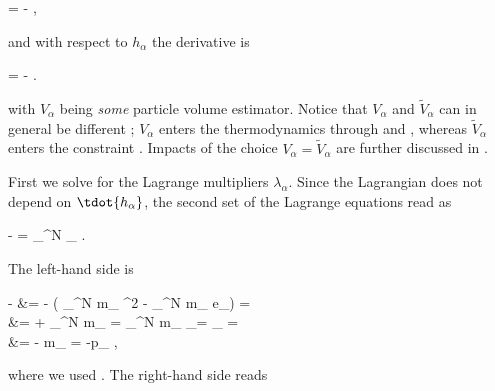 \documentclass[../main.tex]{subfiles}
\begin{document}
\begin{equations}[single,!,numberline=all]
\label{eq:E-X-DERIVATIVE}
 = -  ,
\end{equations}

and with respect to $h_{\alpha}$ the derivative is

\begin{equations}[single,!,numberline=all]
\label{eq:E-H-DERIVATIVE}
 = -  .
\end{equations}

with $V_{\alpha}$ being \emph{some} particle volume estimator. Notice that $V_{\alpha}$ and $\tilde{V}_{\alpha}$ can in general be different \autocite{hopkinsGeneralClassLagrangian2013a}; $V_{\alpha}$ enters the thermodynamics through  and , whereas $\tilde{V}_{\alpha}$ enters the constraint . Impacts of the choice $V_{\alpha} = \tilde{V}_{\alpha}$ are further discussed in \eg \autocite[p.~3]{hopkinsGeneralClassLagrangian2013a}.

First we solve for the Lagrange multipliers $\lambda_{\alpha}$. Since the Lagrangian  does not depend on $\tdot{h_{\alpha}}$, the second set of the Lagrange equations  read as

\begin{equations}[single,*]
	-  = \sum_{}^N \lambda_{\beta} .
\end{equations}

The left-hand side is

\begin{equations}[columns,*]
	-  &= - \left( \sum_{}^N m_{\beta} ^{2} - \sum_{}^N m_{\beta} e_{\beta}\right) = \\
			      &= + \sum_{}^N m_{\beta}  = \sum_{}^N m_{\beta}  _{= \delta_{\beta \alpha}} = \\
	&= - m_{\alpha}  = -p_{\alpha} ,
\end{equations}

where we used . The right-hand side reads
\end{document}
